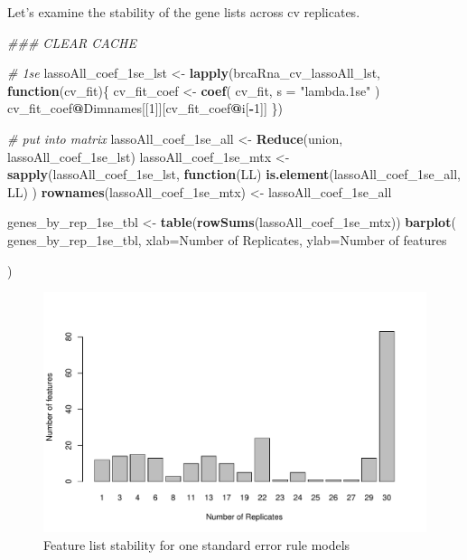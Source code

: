 \documentclass[
]{book}
\newenvironment{Shaded}{\begin{snugshade}}{\end{snugshade}}
\newcommand{\CommentTok}[1]{\textcolor[rgb]{0.56,0.35,0.01}{\textit{#1}}}
\newcommand{\ControlFlowTok}[1]{\textcolor[rgb]{0.13,0.29,0.53}{\textbf{#1}}}
\newcommand{\DataTypeTok}[1]{\textcolor[rgb]{0.13,0.29,0.53}{#1}}
\newcommand{\DecValTok}[1]{\textcolor[rgb]{0.00,0.00,0.81}{#1}}
\newcommand{\KeywordTok}[1]{\textcolor[rgb]{0.13,0.29,0.53}{\textbf{#1}}}
\newcommand{\NormalTok}[1]{#1}
\newcommand{\OperatorTok}[1]{\textcolor[rgb]{0.81,0.36,0.00}{\textbf{#1}}}
\newcommand{\StringTok}[1]{\textcolor[rgb]{0.31,0.60,0.02}{#1}}
\begin{document}
Let's examine the stability of the gene lists across cv replicates.

\begin{Shaded}
\begin{Highlighting}[]
\CommentTok{\#\#\# CLEAR CACHE}


\CommentTok{\# 1se}
\NormalTok{lassoAll\_coef\_1se\_lst <{-}}\StringTok{ }\KeywordTok{lapply}\NormalTok{(brcaRna\_cv\_lassoAll\_lst, }\ControlFlowTok{function}\NormalTok{(cv\_fit)\{}
\NormalTok{ cv\_fit\_coef <{-}}\StringTok{ }\KeywordTok{coef}\NormalTok{(}
\NormalTok{ cv\_fit,}
 \DataTypeTok{s =} \StringTok{"lambda.1se"}
\NormalTok{ )}
\NormalTok{ cv\_fit\_coef}\OperatorTok{@}\NormalTok{Dimnames[[}\DecValTok{1}\NormalTok{]][cv\_fit\_coef}\OperatorTok{@}\NormalTok{i[}\OperatorTok{{-}}\DecValTok{1}\NormalTok{]]}
\NormalTok{ \})}

\CommentTok{\# put into matrix}
\NormalTok{lassoAll\_coef\_1se\_all <{-}}\StringTok{ }\KeywordTok{Reduce}\NormalTok{(union, lassoAll\_coef\_1se\_lst)}
\NormalTok{lassoAll\_coef\_1se\_mtx <{-}}\StringTok{ }\KeywordTok{sapply}\NormalTok{(lassoAll\_coef\_1se\_lst, }
  \ControlFlowTok{function}\NormalTok{(LL) }\KeywordTok{is.element}\NormalTok{(lassoAll\_coef\_1se\_all, LL)}
\NormalTok{)}
\KeywordTok{rownames}\NormalTok{(lassoAll\_coef\_1se\_mtx) <{-}}\StringTok{ }\NormalTok{lassoAll\_coef\_1se\_all}

\NormalTok{genes\_by\_rep\_1se\_tbl <{-}}\StringTok{ }\KeywordTok{table}\NormalTok{(}\KeywordTok{rowSums}\NormalTok{(lassoAll\_coef\_1se\_mtx))}
\KeywordTok{barplot}\NormalTok{(}
\NormalTok{ genes\_by\_rep\_1se\_tbl,}
 \DataTypeTok{xlab=}\StringTok{\textquotesingle{}Number of Replicates\textquotesingle{}}\NormalTok{,}
 \DataTypeTok{ylab=}\StringTok{\textquotesingle{}Number of features\textquotesingle{}}

\NormalTok{)}
\end{Highlighting}
\end{Shaded}

\begin{figure}
\centering
\includegraphics{Static/figures/brca-rnaseq-feature-list-1se-1.pdf}
\caption{\label{fig:brca-rnaseq-feature-list-1se}Feature list stability for one standard error rule models}
\end{figure}
\end{document}
